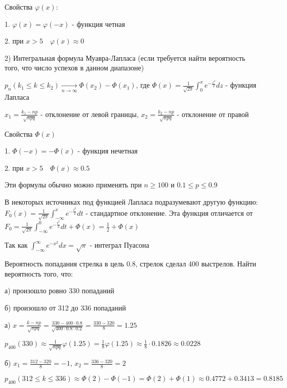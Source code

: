 \documentclass[12pt]{article}
\begin{document}
    Свойства $\varphi(x)$:

    1. $\varphi(x) = \varphi(-x)$ - функция четная

    2. при $x > 5 \quad \varphi(x) \approx 0$

    \hypertarget{integralformulademoivrelaplace}{}

    2) Интегральная формула Муавра-Лапласа (если требуется найти вероятность того, что число успехов в данном диапазоне)

    $p_n(k_1 \leq k \leq k_2) \underset{n \to \infty}{\longrightarrow} \Phi(x_2) - \Phi(x_1)$, где $\Phi(x) = \frac{1}{\sqrt{2\pi}} \int_0^x e^{-\frac{z^2}{2}} dz$ - функция Лапласа

    $x_1 = \frac{k_1 - np}{\sqrt{npq}}$ - отклонение от левой границы, $x_2 = \frac{k_2 - np}{\sqrt{npq}}$ - отклонение от правой

    Свойства $\Phi(x)$

    1. $\Phi(-x) = -\Phi(x)$ - функция нечетная

    2. при $x > 5 \quad \Phi(x) \approx 0.5$

    \Nota Эти формулы обычно можно применять при $n \geq 100$ и $0.1 \leq p \leq 0.9$

    \Nota В некоторых источниках под функцией Лапласа подразумевают другую функцию: $F_0(x) = \frac{1}{\sqrt{2\pi}} \int_{-\infty}^x e^{-\frac{t^2}{2}}dt$ - стандартное отклонение. Эта функция
    отличается от $F_0 = \frac{1}{\sqrt{2\pi}} \int_{-\infty}^0 e^{-\frac{t^2}{2}}dt + \Phi(x) = \frac{1}{2} + \Phi(x)$

    Так как $\int_{-\infty}^{\infty} e^{-x^2} dx = \sqrt{\pi}$ - интеграл Пуасона

    \Ex Вероятность попадания стрелка в цель $0.8$, стрелок сделал 400 выстрелов. Найти вероятность того, что:

    а) произошло ровно 330 попаданий

    б) произошло от 312 до 336 попаданий

    а) $x = \frac{k - np}{\sqrt{npq}} = \frac{330 - 400 \cdot 0.8}{\sqrt{400 \cdot 0.8 \cdot 0.2}} = \frac{330 - 320}{8} = 1.25$

    $p_{400}(330) \approx \frac{1}{\sqrt{npq}} \varphi(1.25) = \frac{1}{8} \varphi(1.25) \approx \frac{1}{8} \cdot 0.1826 \approx 0.0228$

    б) $x_1 = \frac{312 - 320}{8} = -1$, $x_2 = \frac{336 - 320}{8} = 2$

    $p_{400}(312 \leq k \leq 336) \approx \Phi(2) - \Phi(-1) = \Phi(2) + \Phi(1) \approx 0.4772 + 0.3413 = 0.8185$
\end{document}
